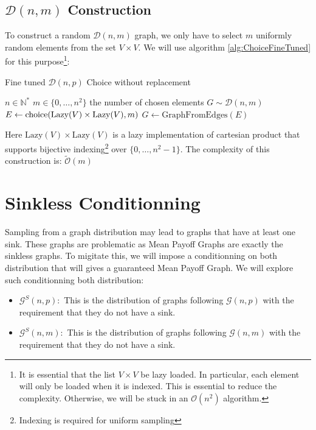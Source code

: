 \subsection{$\mathcal{D}(n,m)$ Construction}
To construct a random $\mathcal{D}(n,m)$ graph, we only have to select $m$ uniformly random elements from the set $V\times V.$
\newline We will use algorithm \ref{alg:ChoiceFineTuned} for this purpose\footnote{It is essential that the list $V\times V$ be lazy loaded. In particular, each element will only be loaded when it is indexed. This is essential to reduce the complexity. Otherwise, we will be stuck in an $\mathcal{O}(n^2)$ algorithm.}:
\begin{algorithm}
	\caption{Fine tuned $\mathcal{D}(n,p)$ Choice without replacement }\label{Dnm} 
	\begin{algorithmic}
		\Require $n\in\mathbb{N}^*$
		\Require $m\in\{0,\dots,n^2\}$ the number of chosen elements
		\Ensure $G\sim \mathcal{D}(n,m)$
		\State $E\leftarrow \operatorname{choice}(\text{Lazy}(V)\times \text{Lazy}(V),m)$ 
		\State \Return $G\leftarrow \text{GraphFromEdges}(E)$
	\end{algorithmic}
\end{algorithm}
\FloatBarrier
Here $\text{Lazy}(V)\times \text{Lazy}(V)$ is a lazy implementation of cartesian product that supports bijective indexing\footnote{Indexing is required for uniform sampling} over $\{0,\dots,n^2-1\}.$
\newline The complexity of this construction is: $
\tilde{\mathcal{O}}(m)
$ 

\section{Sinkless Conditionning}
Sampling from a graph distribution may lead to graphs that have at least one sink. 
\newline These graphs are problematic as Mean Payoff Graphs are exactly the sinkless graphs.
\newline To migitate this, we will impose a conditionning on both distribution that will gives a guaranteed Mean Payoff Graph.
\newline We will explore such conditionning both distribution:
\begin{itemize}
	\item $\mathcal{G}^S(n,p):$ This is the distribution of graphs following $\mathcal{G}(n,p)$ with the requirement that they do not have a sink.
	\item $\mathcal{G}^S(n,m):$ This is the distribution of graphs following $\mathcal{G}(n,m)$ with the requirement that they do not have a sink.
\end{itemize}
